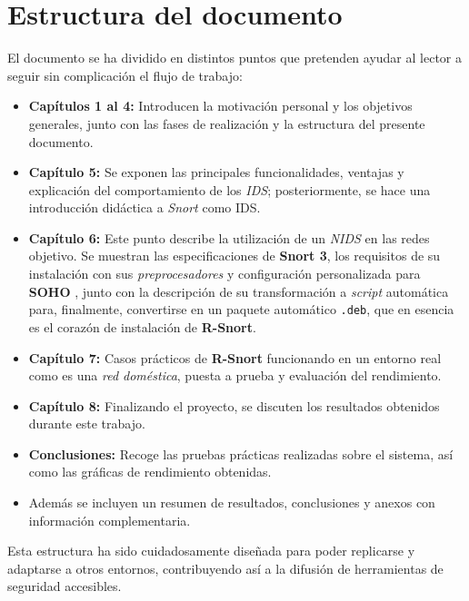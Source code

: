 \documentclass[11pt,a4paper,twoside]{report}
\begin{document}
\pagebreak

\section*{Estructura del documento}

El documento se ha dividido en distintos puntos que pretenden ayudar al lector a seguir sin complicación el flujo de trabajo:

\begin{itemize}
	\item \textbf{Capítulos 1 al 4:} Introducen la motivación personal y los objetivos generales, junto con las fases de realización y la estructura del presente documento.
	
	\item \textbf{Capítulo 5:} Se exponen las principales funcionalidades, ventajas y explicación del comportamiento de los \textit{IDS}; posteriormente, se hace una introducción didáctica a \textit{Snort} como IDS.
	
	\item \textbf{Capítulo 6:} Este punto describe la utilización de un \textit{NIDS} en las redes objetivo. Se muestran las especificaciones de \textbf{Snort 3}, los requisitos de su instalación con sus \textit{preprocesadores} y configuración personalizada para \textbf{SOHO} \cite{cocsar2017firewall}, junto con la descripción de su transformación a \textit{script} automática para, finalmente, convertirse en un paquete automático \texttt{.deb}, que en esencia es el corazón de instalación de \textbf{R-Snort}.
	
	\item \textbf{Capítulo 7:} Casos prácticos de \textbf{R-Snort} funcionando en un entorno real como es una \textit{red doméstica}, puesta a prueba y evaluación del rendimiento.
	
	\item \textbf{Capítulo 8:} Finalizando el proyecto, se discuten los resultados obtenidos durante este trabajo.
	
	\item \textbf{Conclusiones:} Recoge las pruebas prácticas realizadas sobre el sistema, así como las gráficas de rendimiento obtenidas.
	
	\item Además se incluyen un resumen de resultados, conclusiones y anexos con información complementaria.
\end{itemize}

Esta estructura ha sido cuidadosamente diseñada para poder replicarse y adaptarse a otros entornos, contribuyendo así a la difusión de herramientas de seguridad accesibles.
\end{document}
